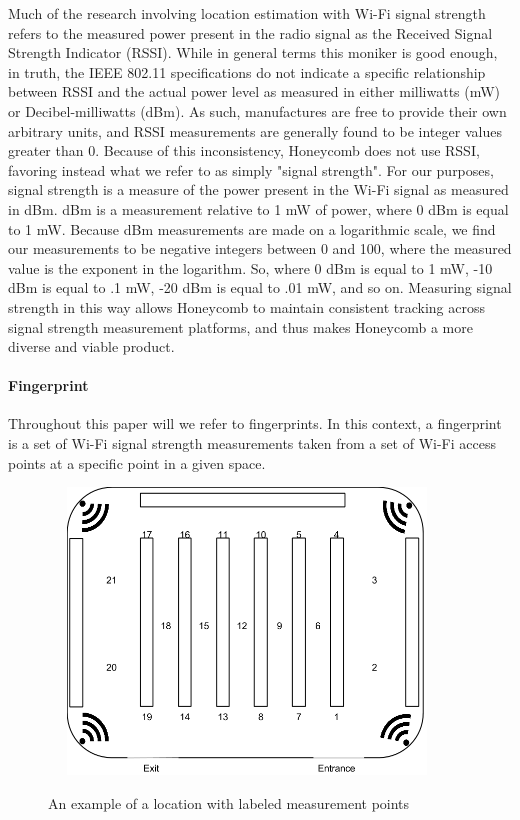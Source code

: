 Much of the research involving location estimation with Wi-Fi signal strength refers to the measured power present in the radio signal as the Received Signal Strength Indicator (RSSI). While in general terms this moniker is good enough, in truth, the IEEE 802.11 specifications \cite{ieee802.11} do not indicate a specific relationship between RSSI and the actual power level as measured in either milliwatts (mW) or Decibel-milliwatts (dBm). As such, manufactures are free to provide their own arbitrary units, and RSSI measurements are generally found to be integer values greater than 0. Because of this inconsistency, Honeycomb does not use RSSI, favoring instead what we refer to as simply "signal strength". For our purposes, signal strength is a measure of the power present in the Wi-Fi signal as measured in dBm. dBm is a measurement relative to 1 mW of power, where 0 dBm is equal to 1 mW. Because dBm measurements are made on a logarithmic scale, we find our measurements to be negative integers between 0 and 100, where the measured value is the exponent in the logarithm. So, where 0 dBm is equal to 1 mW, -10 dBm is equal to .1 mW, -20 dBm is equal to .01 mW, and so on. Measuring signal strength in this way allows Honeycomb to maintain consistent tracking across signal strength measurement platforms, and thus makes Honeycomb a more diverse and viable product.


\paragraph{Fingerprint}
Throughout this paper will we refer to fingerprints. In this context, a fingerprint is a set of Wi-Fi signal strength measurements taken from a set of Wi-Fi access points at a specific point in a given space. 

\begin{figure}[htb] %
	\begin{center}
		\ \includegraphics[width=4in,height=3in]{ExampleLocation.png}
		\caption{An example of a location with labeled measurement points}
		\label{storeexample}
	\end{center}
\end{figure}


